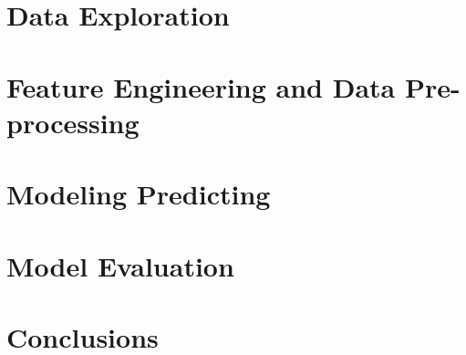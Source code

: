 \documentclass[12pt]{article}
\begin{document}
\section{Data Exploration}

\section{Feature Engineering and Data Pre-processing}

\section{Modeling Predicting}

\section{Model Evaluation}

\section{Conclusions}

 
 
\end{document}
